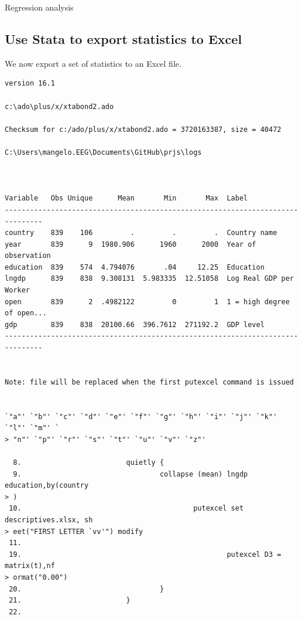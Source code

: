 \documentclass[
  12pt,
]{article}
\begin{document}
\begin{table}[ht]
\caption{Regression analysis}
\label{tab:stata}
  
\end{table}

\hypertarget{use-stata-to-export-statistics-to-excel}{%
\subsection{Use Stata to export statistics to Excel}\label{use-stata-to-export-statistics-to-excel}}

We now export a set of statistics to an Excel file.

\begin{verbatim}
version 16.1

c:\ado\plus/x/xtabond2.ado

Checksum for c:/ado/plus/x/xtabond2.ado = 3720163387, size = 40472

C:\Users\mangelo.EEG\Documents\GitHub\prjs\logs



Variable   Obs Unique      Mean       Min       Max  Label
-------------------------------------------------------------------------------
country    839    106         .         .         .  Country name
year       839      9  1980.906      1960      2000  Year of observation
education  839    574  4.794076       .04     12.25  Education
lngdp      839    838  9.308131  5.983335  12.51058  Log Real GDP per Worker
open       839      2  .4982122         0         1  1 = high degree of open...
gdp        839    838  20100.66  396.7612  271192.2  GDP level
-------------------------------------------------------------------------------


Note: file will be replaced when the first putexcel command is issued


`"a"' `"b"' `"c"' `"d"' `"e"' `"f"' `"g"' `"h"' `"i"' `"j"' `"k"' `"l"' `"m"' `
> "n"' `"p"' `"r"' `"s"' `"t"' `"u"' `"v"' `"z"'

  8.                         quietly {
  9.                                 collapse (mean) lngdp education,by(country
> )
 10.                                         putexcel set descriptives.xlsx, sh
> eet("FIRST LETTER `vv'") modify
 11.                                         
 19.                                                 putexcel D3 = matrix(t),nf
> ormat("0.00")
 20.                                 }
 21.                         }
 22.                         




\end{verbatim}
\end{document}

